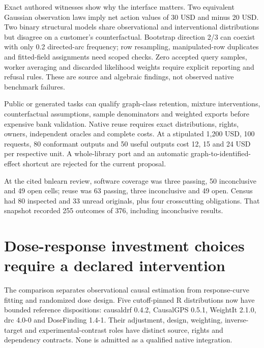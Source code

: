 Exact authored witnesses show why the interface matters. Two equivalent
Gaussian observation laws imply net action values of 30 USD and minus 20
USD. Two binary structural models share observational and interventional
distributions but disagree on a customer's counterfactual. Bootstrap
direction 2/3 can coexist with only 0.2 directed-arc frequency; row
resampling, manipulated-row duplicates and fitted-field assignments need
scoped checks. Zero accepted query samples, worker averaging and
discarded likelihood weights require explicit reporting and refusal
rules. These are source and algebraic findings, not observed native
benchmark failures. \citep{exec24_bnlearn_contract}

Public or generated tasks can qualify graph-class retention, mixture
interventions, counterfactual assumptions, sample denominators and
weighted exports before expensive bank validation. Native reuse requires
exact distributions, rights, owners, independent oracles and complete
costs. At a stipulated 1,200 USD, 100 requests, 80 conformant outputs
and 50 useful outputs cost 12, 15 and 24 USD per respective unit. A
whole-library port and an automatic graph-to-identified-effect shortcut
are rejected for the current proposal. \citep{exec24_bnlearn_contract}

At the cited bnlearn review, software coverage was three passing, 50
inconclusive and 49 open cells; reuse was 63 passing, three inconclusive
and 49 open. Census had 80 inspected and 33 unread originals, plus four
crosscutting obligations. That snapshot recorded 255 outcomes of 376,
including inconclusive results.
\citep{sp24bnlearn_reader,sp24bnlearn_progress}

\hypertarget{dose-response-investment-choices-require-a-declared-intervention}{%
\section{Dose-response investment choices require a declared
intervention}\label{dose-response-investment-choices-require-a-declared-intervention}}

The comparison separates observational causal estimation from
response-curve fitting and randomized dose design. Five cutoff-pinned R
distributions now have bounded reference dispositions: causaldrf 0.4.2,
CausalGPS 0.5.1, WeightIt 2.1.0, drc 4.0-0 and DoseFinding 1.4-1. Their
adjustment, design, weighting, inverse-target and experimental-contrast
roles have distinct source, rights and dependency contracts. None is
admitted as a qualified native integration.
\citep{exec24_dose_causaldrf,exec24_dose_causalgps,exec24_dose_weightit,exec24_dose_drc,exec24_dose_dosefinding}

